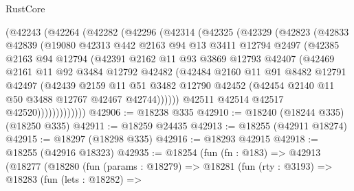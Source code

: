 \begin{lexlean}{RustCore}
\begin{coremodule}
          (@42243
            (@42264
              (@42282
                (@42296
                  (@42314
                    (@42325
                      (@42329
                        (@42823
                          (@42833
                            @42839
                            (@19080
                              @42313
                              @442
                              @2163
                              @94
                              @13
                              @3411
                              @12794
                              @2497
                              (@42385
                                @2163
                                @94
                                @12794
                                (@42391
                                  @2162
                                  @11
                                  @93
                                  @3869
                                  @12793
                                  @42407
                                  (@42469
                                    @2161
                                    @11
                                    @92
                                    @3484
                                    @12792
                                    @42482
                                    (@42484
                                      @2160
                                      @11
                                      @91
                                      @8482
                                      @12791
                                      @42497
                                      (@42439
                                        @2159
                                        @11
                                        @51
                                        @3482
                                        @12790
                                        @42452
                                        (@42454 @2140 @11 @50 @3488 @12767 @42467 @42744))))))
                              @42511
                              @42514
                              @42517
                              @42520)))))))))))))
@42906 := @18238 @335
@42910 := @18240 (@18244 @335) (@18250 @335)
@42911 := @18259 @24435
@42913 := @18255 (@42911 @18274)
@42915 := @18297 (@18298 @335)
@42916 := @18293 @42915
@42918 := @18255 (@42916 @18323)
@42935 := @18254
    (fun (fn : @183) =>
    @42913
      (@18277
        (@18280
          (fun (params : @18279) =>
          @18281
            (fun (rty : @3193) =>
            @18283
              (fun (lets : @18282) =>

\end{coremodule}
\end{lexlean}
